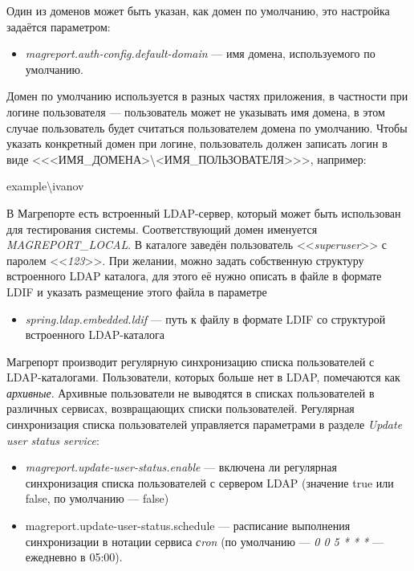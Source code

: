 \documentclass[../user-manual.tex]{subfiles}
\begin{document}
	Один из доменов может быть указан, как домен по умолчанию, это настройка задаётся параметром:
	
	\begin{itemize}
		\item \textit{magreport.auth-config.default-domain} --- имя домена, используемого по умолчанию.
	\end{itemize}

	Домен по умолчанию используется в разных частях приложения, в частности при логине пользователя --- пользователь может не указывать имя домена, в этом случае пользователь будет считаться пользователем домена по умолчанию. Чтобы указать конкретный домен при логине, пользователь должен записать логин в виде <<<ИМЯ\_ДОМЕНА>\textbackslash<ИМЯ\_ПОЛЬЗОВАТЕЛЯ>>>, например:
	
	\begin{center}
		example\textbackslash ivanov
	\end{center}

	В Магрепорте есть встроенный LDAP-сервер, который может быть использован для тестирования системы. Соответствующий домен именуется \textit{MAGREPORT\_LOCAL}. В каталоге заведён пользователь <<\textit{superuser}>> с паролем <<\textit{123}>>. При желании, можно задать собственную структуру встроенного LDAP каталога, для этого её нужно описать в файле в формате LDIF и указать размещение этого файла в параметре
	
	\begin{itemize}
		\item \textit{spring.ldap.embedded.ldif} --- путь к файлу в формате LDIF со структурой встроенного LDAP-каталога
	\end{itemize}

	Магрепорт производит регулярную синхронизацию списка пользователей с LDAP-каталогами. Пользователи, которых больше нет в LDAP, помечаются как \textit{архивные}. Архивные пользователи не выводятся в списках пользователей в различных сервисах, возвращающих списки пользователей. Регулярная синхронизация списка пользователей управляется параметрами в разделе \textit{Update user status service}:
		
	\begin{itemize}
		\item \textit{magreport.update-user-status.enable} --- включена ли регулярная синхронизация списка пользователей с сервером LDAP (значение true или false, по умолчанию --- false)
		
		\item magreport.update-user-status.schedule --- расписание выполнения синхронизации в нотации сервиса \textit{сron} (по умолчанию --- \textit{0 0 5 * * *} --- ежедневно в 05:00).
	\end{itemize}		
	
\end{document}
